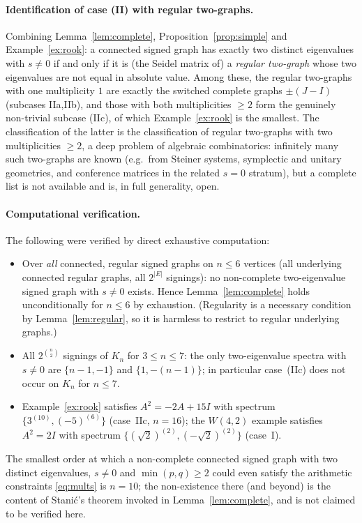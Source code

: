 \documentclass{amsart}
\theoremstyle{definition}
\begin{document}
\paragraph{Identification of case (II) with regular two-graphs.}
Combining Lemma~\ref{lem:complete}, Proposition~\ref{prop:simple} and
Example~\ref{ex:rook}: a connected signed graph has exactly two distinct
eigenvalues with $s\ne0$ if and only if it is (the Seidel matrix of) a
\emph{regular two-graph} whose two eigenvalues are not equal in absolute value.
Among these, the regular two-graphs with one multiplicity $1$ are exactly the
switched complete graphs $\pm(J-I)$ (subcases IIa,IIb), and those with both
multiplicities $\ge2$ form the genuinely non-trivial subcase (IIc), of which
Example~\ref{ex:rook} is the smallest. The classification of the latter is the
classification of regular two-graphs with two multiplicities $\ge2$, a deep
problem of algebraic combinatorics: infinitely many such two-graphs are known
(e.g.\ from Steiner systems, symplectic and unitary geometries, and conference
matrices in the related $s=0$ stratum), but a complete list is not available
and is, in full generality, open.

\paragraph{Computational verification.} The following were verified by direct
exhaustive computation:
\begin{itemize}
\item Over \emph{all} connected, regular signed graphs on $n\le6$ vertices (all
underlying connected regular graphs, all $2^{|E|}$ signings): no non-complete
two-eigenvalue signed graph with $s\ne0$ exists. Hence Lemma~\ref{lem:complete}
holds unconditionally for $n\le6$ by exhaustion. (Regularity is a necessary
condition by Lemma~\ref{lem:regular}, so it is harmless to restrict to regular
underlying graphs.)
\item All $2^{\binom n2}$ signings of $K_n$ for $3\le n\le7$: the only
two-eigenvalue spectra with $s\ne0$ are $\{n-1,-1\}$ and $\{1,-(n-1)\}$; in
particular case~(IIc) does not occur on $K_n$ for $n\le7$.
\item Example~\ref{ex:rook} satisfies $A^2=-2A+15I$ with spectrum
$\{3^{(10)},(-5)^{(6)}\}$ (case~IIc, $n=16$); the $W(4,2)$ example satisfies
$A^2=2I$ with spectrum $\{(\sqrt2)^{(2)},(-\sqrt2)^{(2)}\}$ (case~I).
\end{itemize}
The smallest order at which a non-complete connected signed graph with two
distinct eigenvalues, $s\ne0$ and $\min(p,q)\ge2$ could even satisfy the
arithmetic constraints \eqref{eq:mults} is $n=10$; the non-existence there (and
beyond) is the content of Stani\'c's theorem invoked in
Lemma~\ref{lem:complete}, and is not claimed to be verified here.
\end{document}
